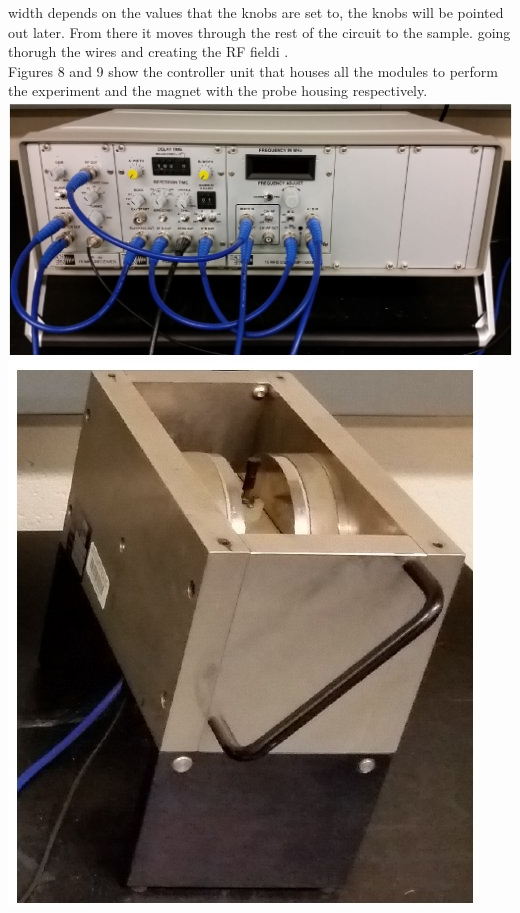 \documentclass{article}
\begin{document}
{\begin{multicols}{2}
width depends on the values that the knobs are set to, the knobs will be 
pointed out later. From there it moves through the rest of the circuit to the 
sample. going thorugh the wires and creating the RF fieldi \cite{ref:2}.
\\
Figures 8 and 9 show the controller unit that houses all the modules to perform 
the experiment and the magnet with the probe housing respectively.
\center
\includegraphics[width=\linewidth]{pic-de-manual/main-setup.jpg}
\label{fig:8}
\includegraphics[width=\linewidth]{pic-de-manual/iman.jpg}

\end{multicols}}
\end{document}

